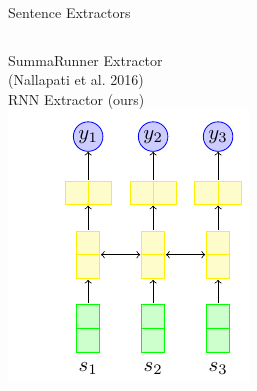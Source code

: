 \begin{frame}{Sentence Extractors}
 \begin{columns}[t]
   \centering
   SummaRunner Extractor\\
   (Nallapati et al. 2016)\\
   RNN Extractor (ours)\\
   \includegraphics[scale=.65]{3_deep_learning_models_of_salience/image_texs/rnn/rnn.pdf}

\end{columns}
\end{frame}
